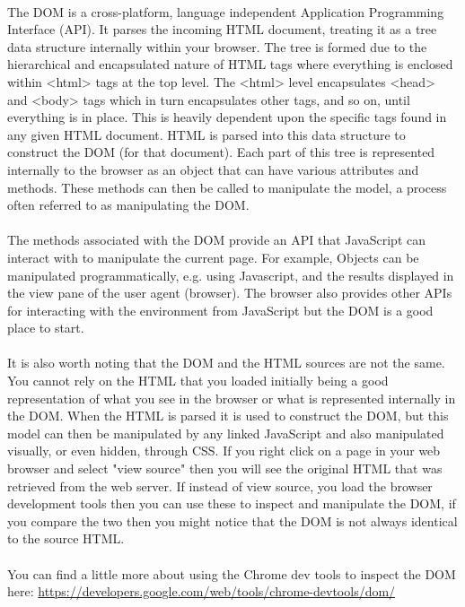 \documentclass[12pt, a4paper, oneside]{book}
\begin{document}
\paragraph{} The DOM is a cross-platform, language independent Application Programming Interface (API). It parses the incoming HTML document, treating it as a tree data structure internally within your browser. The tree is formed due to the hierarchical and encapsulated nature of HTML tags where everything is enclosed within <html> tags at the top level. The <html> level encapsulates <head> and <body> tags which in turn encapsulates other tags, and so on, until everything is in place. This is heavily dependent upon the specific tags found in any given HTML document. HTML is parsed into this data structure to construct the DOM (for that document). Each part of this tree is represented internally to the browser as an object that can have various attributes and methods. These methods can then be called to manipulate the model, a process often referred to as manipulating the DOM. 
\paragraph{} The methods associated with the DOM provide an API that JavaScript can interact with to manipulate the current page. For example, Objects can be manipulated programmatically, e.g. using Javascript, and the results displayed in the view pane of the user agent (browser). The browser also provides other APIs for interacting with the environment from JavaScript but the DOM is a good place to start.
\paragraph{} It is also worth noting that the DOM and the HTML sources are not the same. You cannot rely on the HTML that you loaded initially being a good representation of what you see in the browser or what is represented internally in the DOM. When the HTML is parsed it is used to construct the DOM, but this model can then be manipulated by any linked JavaScript and also manipulated visually, or even hidden, through CSS. If you right click on a page in your web browser and select "view source" then you will see the original HTML that was retrieved from the web server. If instead of view source, you load the browser development tools then you can use these to inspect and manipulate the DOM, if you compare the two then you might notice that the DOM is not always identical to the source HTML.
\paragraph{} You can find a little more about using the Chrome dev tools to inspect the DOM here:
	\url{https://developers.google.com/web/tools/chrome-devtools/dom/}
\end{document}
